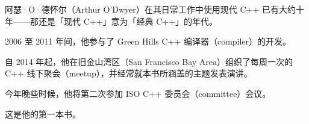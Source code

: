 阿瑟·O·德怀尔（Arthur O'Dwyer）在其日常工作中使用现代 C++ 已有大约十年——那还是「现代 C++」意为「经典 C++」的年代。

2006 至 2011 年间，他参与了 Green Hills C++ 编译器（compiler）的开发。

自 2014 年起，他在旧金山湾区（San Francisco Bay Area）组织了每周一次的 C++ 线下聚会（meetup），并经常就本书所涵盖的主题发表演讲。

今年晚些时候，他将第二次参加 ISO C++ 委员会（committee）会议。

这是他的第一本书。
